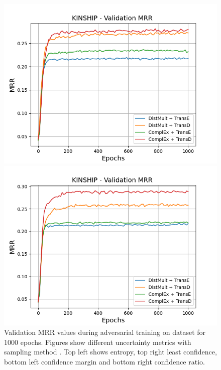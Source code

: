 \begin{figure}[H]
\begin{minipage}{.5\textwidth}
    \end{minipage}
    \begin{minipage}{.5\textwidth}
      \centering
      \includegraphics[width=0.9\linewidth]{figures/results/gan_train/not_pretrained/uncertainty/max_distribution/confidence_margin/kinship/1k_epochs/uncertainty_kinship_mrrs.png}
    \end{minipage}%
    \begin{minipage}{.5\textwidth}
      \centering
      \includegraphics[width=0.9\linewidth]{figures/results/gan_train/not_pretrained/uncertainty/max_distribution/confidence_ratio/kinship/1k_epochs/uncertainty_kinship_mrrs.png}
    \end{minipage}%
    \caption{Validation MRR values during adversarial training on \kinship dataset for 1000 epochs. 
    Figures show different uncertainty metrics with sampling method  \ussoftmax.
    Top left shows entropy, top right least confidence, 
    bottom left confidence margin and bottom right confidence ratio.}
    \label{fig:advtrain_metrics_kinship}
\end{figure}



